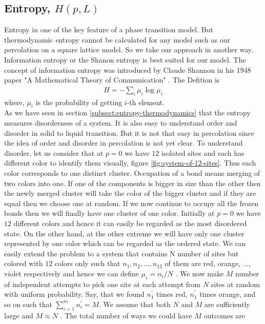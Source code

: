 	\subsection{Entropy, $H(p,L)$}
	Entropy in one of the key feature of a phase transition model. But thermodynamic entropy cannot be calculated for any model such as our percolation on a square lattice model. So we take our approach in another way. Information entropy or the Shanon entropy is best suited for our model. The concept of information entropy was introduced by Claude Shannon in his 1948 paper "A Mathematical Theory of Communication" \cite{shanon_entropy}. The Defition is
	\begin{align}
		H = - \sum_{i} \mu_i \log \mu_i	
		\label{def:shannon-entropy-def}
	\end{align}
	where, $\mu_i$ is the probability of getting $i$-th element.\\
	As we have seen in section \ref{subsect:entropy-thermodynamics} that the entropy measures disorderness of a system. It is also easy to understand	order and disorder in solid to liquid transition. But it is not that easy in percolation since the idea of order and disorder in percolation is not yet clear. To understand	disorder, let us consider that at $p=0$ we have $12$ isolated	sites and each has different color to identify them visually, figure \ref{fig:system-of-12-sites}. Thus each color corresponds to one distinct cluster. Occupation of a bond means merging of two colors into	one. If one of the components is bigger in size than the	other then the newly merged cluster will take the color	of the bigger cluster and if they are equal then we choose	one at random. If we now continue to occupy all the	frozen bonds then we will finally have one cluster of one	color. Initially at $p = 0$ we have $12$ different colors and	hence it can easily be regarded as the most disordered	state. On the other hand, at the other extreme we will	have only one cluster represented by one color which can	be regarded as the ordered state. We can easily extend	the problem to a system that contains N number of sites	but colored with $12$ colors only such that $n_1, n_2, \ldots, n_{12}$ of them are red, orange, ..., violet respectively and hence	we can define $\mu_i = n_i /N$ . We now make $M$ number of	independent attempts to pick one site at each attempt	from $N$ sites at random with uniform probability. Say, that we found $n_1^\prime$ times red, $n_1^\prime$ times orange, and so on	such that $\sum_{i=1}^{m} n_i^\prime = M$. We assume that both $N$ and $M$ are sufficiently large and $M \approx N$ . The total number	of ways we could have $M$ outcomes are
